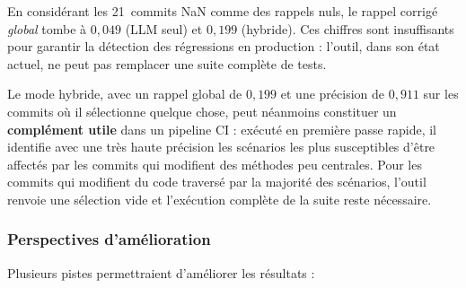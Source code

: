\documentclass[12pt,a4paper]{article}
\begin{document}
En considérant les 21~commits NaN comme des rappels nuls, le rappel
corrigé \emph{global} tombe à $0{,}049$ (LLM seul) et $0{,}199$ (hybride).
Ces chiffres sont insuffisants pour garantir la détection des régressions
en production : l'outil, dans son état actuel, ne peut pas remplacer une
suite complète de tests.

Le mode hybride, avec un rappel global de $0{,}199$ et une précision de
$0{,}911$ sur les commits où il sélectionne quelque chose, peut néanmoins
constituer un \textbf{complément utile} dans un pipeline CI : exécuté en
première passe rapide, il identifie avec une très haute précision les
scénarios les plus susceptibles d'être affectés par les commits qui
modifient des méthodes peu centrales. Pour les commits qui modifient du
code traversé par la majorité des scénarios, l'outil renvoie une
sélection vide et l'exécution complète de la suite reste nécessaire.

\subsubsection{Perspectives d'amélioration}

Plusieurs pistes permettraient d'améliorer les résultats :
\end{document}
